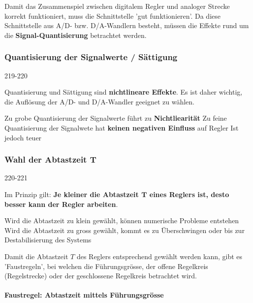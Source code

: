 Damit das Zusammenspiel zwischen digitalem Regler und analoger Strecke korrekt funktioniert, muss die Schnittstelle 'gut funktionieren'.
Da diese Schnittstelle aus A/D- bzw. D/A-Wandlern besteht, müssen die Effekte rund um die \textbf{Signal-Quantisierung} betrachtet werden.


\subsubsection{Quantisierung der Signalwerte / Sättigung}{219-220}

Quantisierung und Sättigung sind \textbf{nichtlineare Effekte}. Es ist daher wichtig, die Auflösung der A/D- und D/A-Wandler geeignet zu wählen.

\smallskip

\begin{outline}
    \1 Zu grobe Quantisierung der Signalwerte führt zu \textbf{Nichtliearität}
    \1 Zu feine Quantisierung der Signalwete hat \textbf{keinen negativen Einfluss} auf Regler
        \2 Ist jedoch teuer
\end{outline}


\subsubsection{Wahl der Abtastzeit $\bm{T}$}{220-221}

Im Prinzip gilt: \textbf{Je kleiner die Abtastzeit $\bm{T}$ eines Reglers ist, desto besser kann der Regler arbeiten}.

\smallskip

\begin{outline}
    \1 Wird die Abtastzeit zu klein gewählt, können numerische Probleme entstehen
    \1 Wird die Abtastzeit zu gross gewählt, kommt es zu Überschwingen oder bis zur Destabilisierung des Systems
\end{outline}

\smallskip

Damit die Abtastzeit $T$ des Reglers entsprechend gewählt werden kann, gibt es 'Faustregeln', bei welchen die Führungsgrösse, der offene Regelkreis 
(Regelstrecke) oder der geschlossene Regelkreis betrachtet wird.

\medskip

\paragraph{Faustregel: Abtastzeit mittels Führungsgrösse}

